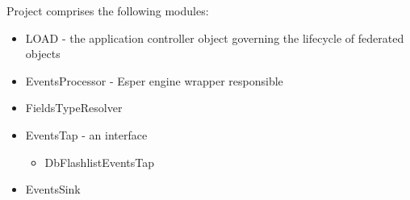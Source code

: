 Project comprises the following modules:
\begin{itemize}
	\item LOAD - the application controller object governing the lifecycle of federated objects
	\item EventsProcessor - Esper engine wrapper responsible
	\item FieldsTypeResolver
	\item EventsTap - an interface 
	\begin{itemize}
		\item DbFlashlistEventsTap
	\end{itemize}
	\item EventsSink
\end{itemize}
